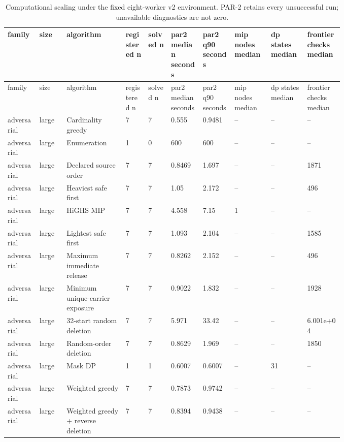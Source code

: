 {\footnotesize
\begin{longtable}{p{0.07\linewidth}p{0.06\linewidth}p{0.13\linewidth}p{0.055\linewidth}p{0.055\linewidth}p{0.075\linewidth}p{0.075\linewidth}p{0.085\linewidth}p{0.085\linewidth}p{0.085\linewidth}}
\caption{Computational scaling under the fixed eight-worker v2 environment. PAR-2 retains every unsuccessful run; unavailable diagnostics are not zero.}\label{tab:aor-computational-scaling}\\
\toprule
family & size & algorithm & registered n & solved n & par2 median seconds & par2 q90 seconds & mip nodes median & dp states median & frontier checks median \\
\midrule
\endfirsthead
\toprule
family & size & algorithm & registered n & solved n & par2 median seconds & par2 q90 seconds & mip nodes median & dp states median & frontier checks median \\
\midrule
\endhead
adversarial & large & Cardinality greedy & 7 & 7 & 0.555 & 0.9481 & -- & -- & -- \\
adversarial & large & Enumeration & 1 & 0 & 600 & 600 & -- & -- & -- \\
adversarial & large & Declared source order & 7 & 7 & 0.8469 & 1.697 & -- & -- & 1871 \\
adversarial & large & Heaviest safe first & 7 & 7 & 1.05 & 2.172 & -- & -- & 496 \\
adversarial & large & HiGHS MIP & 7 & 7 & 4.558 & 7.15 & 1 & -- & -- \\
adversarial & large & Lightest safe first & 7 & 7 & 1.093 & 2.104 & -- & -- & 1585 \\
adversarial & large & Maximum immediate release & 7 & 7 & 0.8262 & 2.152 & -- & -- & 496 \\
adversarial & large & Minimum unique-carrier exposure & 7 & 7 & 0.9022 & 1.832 & -- & -- & 1928 \\
adversarial & large & 32-start random deletion & 7 & 7 & 5.971 & 33.42 & -- & -- & 6.001e+04 \\
adversarial & large & Random-order deletion & 7 & 7 & 0.8629 & 1.969 & -- & -- & 1850 \\
adversarial & large & Mask DP & 1 & 1 & 0.6007 & 0.6007 & -- & 31 & -- \\
adversarial & large & Weighted greedy & 7 & 7 & 0.7873 & 0.9742 & -- & -- & -- \\
adversarial & large & Weighted greedy + reverse deletion & 7 & 7 & 0.8394 & 0.9438 & -- & -- & -- \\

\end{longtable}}
